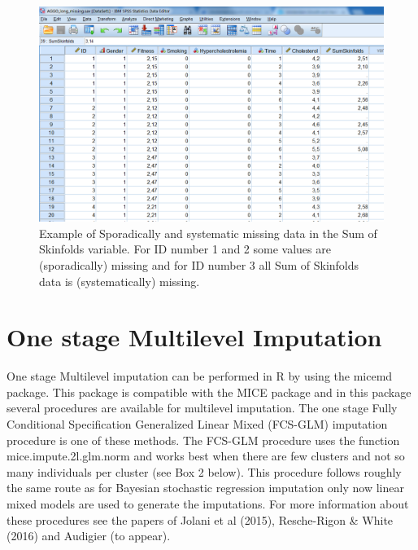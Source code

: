 \documentclass[]{book}
\begin{document}
\begin{figure}

{\centering \includegraphics[width=0.9\linewidth]{images/fig7.15} 

}

\caption{Example of Sporadically and systematic missing data in the Sum of Skinfolds variable. For ID number 1 and 2 some values are (sporadically) missing and for ID number 3 all Sum of Skinfolds data is (systematically) missing.}\label{fig:fig85}
\end{figure}

\section{One stage Multilevel
Imputation}\label{one-stage-multilevel-imputation}

One stage Multilevel imputation can be performed in R by using the
micemd package. This package is compatible with the MICE package and in
this package several procedures are available for multilevel imputation.
The one stage Fully Conditional Specification Generalized Linear Mixed
(FCS-GLM) imputation procedure is one of these methods. The FCS-GLM
procedure uses the function mice.impute.2l.glm.norm and works best when
there are few clusters and not so many individuals per cluster (see Box
2 below). This procedure follows roughly the same route as for Bayesian
stochastic regression imputation only now linear mixed models are used
to generate the imputations. For more information about these procedures
see the papers of Jolani et al (2015), Resche-Rigon \& White (2016) and
Audigier (to appear).
\end{document}
